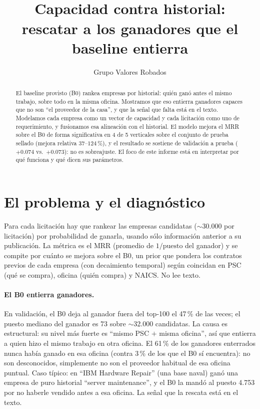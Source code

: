\documentclass[11pt]{article}
\title{\vspace{-1.2cm}{\Large ¿Quién gana la licitación?}\\[3pt]
\large Capacidad contra historial: rescatar a los ganadores que el baseline entierra}
\author{Grupo Valores Robados}
\date{}
\begin{document}
\maketitle
\vspace{-1.1cm}

\begin{abstract}
\noindent El baseline provisto (B0) rankea empresas por historial: quién ganó antes el mismo
trabajo, sobre todo en la misma oficina. Mostramos que eso entierra ganadores capaces que no son
``el proveedor de la casa'', y que la señal que falta está en el texto. Modelamos cada empresa como
un vector de capacidad y cada licitación como uno de requerimiento, y fusionamos esa alineación con
el historial. El modelo mejora el MRR sobre el B0 de forma significativa en 4 de 5 verticales sobre
el conjunto de prueba sellado (mejora relativa $37$--$124\,\%$), y el resultado se sostiene de
validación a prueba ($+0.074$ vs.\ $+0.073$): no es sobreajuste. El foco de este informe está en
interpretar por qué funciona y qué dicen sus parámetros.
\end{abstract}

\section{El problema y el diagnóstico}

Para cada licitación hay que rankear las empresas candidatas ($\sim$30.000 por licitación) por
probabilidad de ganarla, usando sólo información anterior a su publicación. La métrica es el MRR
(promedio de $1/\text{puesto}$ del ganador) y se compite por cuánto se mejora sobre el B0, un prior
que pondera los contratos previos de cada empresa (con decaimiento temporal) según coincidan en PSC
(qué se compra), oficina (quién compra) y NAICS. No lee texto.

\paragraph{El B0 entierra ganadores.} En validación, el B0 deja al ganador fuera del top-100 el
47\,\% de las veces; el puesto mediano del ganador es 73 sobre $\sim$32.000 candidatas. La causa es
estructural: su nivel más fuerte es ``mismo PSC $+$ misma oficina'', así que entierra a quien hizo
el mismo trabajo en otra oficina. El 61\,\% de los ganadores enterrados nunca había ganado en esa
oficina (contra 3\,\% de los que el B0 sí encuentra): no son desconocidos, simplemente no son el
proveedor habitual de esa oficina puntual. Caso típico: en ``IBM Hardware Repair'' (una base naval)
ganó una empresa de puro historial ``server maintenance'', y el B0 la mandó al puesto 4.753 por no
haberle vendido antes a esa oficina. La señal que la rescata está en el texto.
\end{document}
